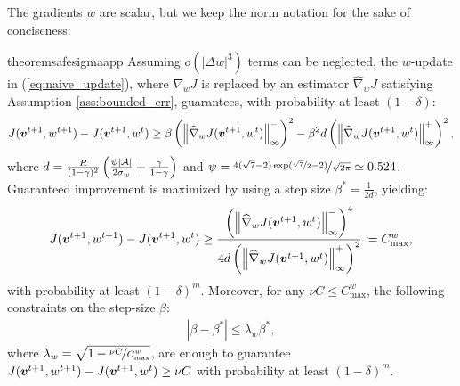 The gradients \wrt $w$ are scalar, but we keep the norm notation for the sake of conciseness:
%
\begin{restatable}[]{theorem}{safesigmaapp}\label{th:safesigmaapp}
	Assuming $o(|\Delta w|^3)$ terms can be neglected, the $w$-update in (\ref{eq:naive_update}), where $\nabla_wJ$ is replaced by an estimator $\widehat{\nabla}_{w}J$ satisfying Assumption \ref{ass:bounded_err}, guarantees, with probability at least $(1-\delta)$:
	\begin{align}
	J(\vv^{t+1}, w^{t+1}) - J(\vv^{t+1}, w^t) \geq \beta\left(\norm[\infty]{\widehat{\nabla}_wJ(\vv^{t+1},w^t)}^-\right)^2 - \beta^2 d\left(\norm[\infty]{\widehat{\nabla}_wJ(\vv^{t+1},w^t)}^+\right)^2,
	\end{align}
	where $d=\frac{R}{(1-\gamma)^2}\left(\frac{\psi|\Aspace|}{2\sigma_{w}}+\frac{\gamma}{1-\gamma}\right)$ and $\psi = \nicefrac{4(\sqrt{7} - 2)\exp(\nicefrac{\sqrt{7}}{2} - 2)}{\sqrt{2\pi}} \simeq 0.524$. Guaranteed improvement is maximized by using a step size $\beta^*=\frac{1}{2d}$, yielding:
	\begin{align}
	J(\vv^{t+1},w^{t+1}) - J(\vv^{t+1}, w^t) \geq \frac{\left(\norm[\infty]{\widehat{\nabla}_wJ(\vv^{t+1},w^t)}^-\right)^4}{4d\left(\norm[\infty]{\widehat{\nabla}_wJ(\vv^{t+1},w^t)}^+\right)^2}
	\coloneqq C_{\text{max}}^w, 
	\end{align}
	with probability at least $(1-\delta)^m$. Moreover, for any $\nu C\leq C_{\text{max}}^{w}$, the following constraints on the step-size $\beta$:
	\begin{align}
	|\beta - \beta^*| \leq \lambda_{w}\beta^*, 
	\end{align}
	where $\lambda_{w}=\sqrt{1 - \nicefrac{\nu C}{C_{\text{max}}^{w}}}$, are enough to guarantee $J(\vv^{t+1},w^{t+1}) - J(\vv^{t+1},w^t)\geq \nu C$ with probability at least $(1-\delta)^m$.
\end{restatable}


